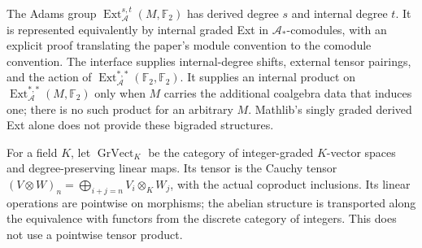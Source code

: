 \begin{definition}
  \label{def:adams-bigraded-ext}
  \notready
  The Adams group $\operatorname{Ext}_{\mathcal A}^{s,t}(M,\mathbb F_2)$ has
  derived degree $s$ and internal degree $t$.  It is represented equivalently
  by internal graded Ext in $\mathcal A_*$-comodules, with an explicit proof
  translating the paper's module convention to the comodule convention.  The
  interface supplies internal-degree shifts, external tensor pairings, and the
  action of
  $\operatorname{Ext}_{\mathcal A}^{*,*}(\mathbb F_2,\mathbb F_2)$.
  It supplies an internal product on
  $\operatorname{Ext}_{\mathcal A}^{*,*}(M,\mathbb F_2)$ only when $M$ carries
  the additional coalgebra data that induces one; there is no such product for
  an arbitrary $M$.  Mathlib's singly graded derived Ext alone does not provide
  these bigraded structures.
\end{definition}

\begin{definition}
  \label{def:graded-vector-space-cauchy}
  \leanok
  For a field $K$, let $\operatorname{GrVect}_K$ be the category of
  integer-graded $K$-vector spaces and degree-preserving linear maps.
  Its tensor is the Cauchy tensor
  $(V\otimes W)_n=\bigoplus_{i+j=n}V_i\otimes_K W_j$, with the actual
  coproduct inclusions. Its linear operations are pointwise on morphisms;
  the abelian structure is transported along the equivalence with functors
  from the discrete category of integers. This does not use a pointwise
  tensor product.
\end{definition}

